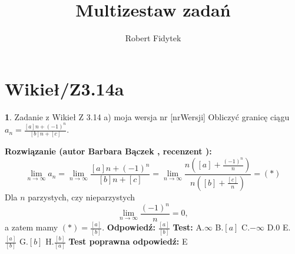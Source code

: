 \documentclass[12pt, a4paper]{article}
\title{Multizestaw zadań}
\author{Robert Fidytek}
\date{}
\theoremstyle{definition} %
\newtheorem{zad}{}
\newcommand{\kategoria}[1]{\section{#1}} %
\newcommand{\zadStart}[1]{\begin{zad}#1\newline} %
\newcommand{\zadStop}{\end{zad}}   %
\newcommand{\rozwStart}[2]{\noindent \textbf{Rozwiązanie (autor #1 , recenzent #2): }\newline} %
\newcommand{\rozwStop}{\newline}                                            %
\newcommand{\odpStart}{\noindent \textbf{Odpowiedź:}\newline}    %
\newcommand{\odpStop}{\newline}                                             %
\newcommand{\testStart}{\noindent \textbf{Test:}\newline} %
\newcommand{\testStop}{\newline} %
\newcommand{\kluczStart}{\noindent \textbf{Test poprawna odpowiedź:}\newline} %
\newcommand{\kluczStop}{\newline} %
\begin{document}
\maketitle


\kategoria{Wikieł/Z3.14a}
\zadStart{Zadanie z Wikieł Z 3.14 a) moja wersja nr [nrWersji]}
Obliczyć granicę ciągu $a_n= \frac{[a]n + {(-1)}^n}{[b]n+[c]}$.
\zadStop
\rozwStart{Barbara Bączek}{}
$$\lim_{n \rightarrow \infty} a_n= \lim_{n \rightarrow \infty} \frac{[a]n + {(-1)}^n}{[b]n+[c]}=  \lim_{n \rightarrow \infty} \frac{n([a] + \frac{{(-1)}^n}{n})}{n([b]+\frac{[c]}{n})} = (*)$$
Dla $n$ parzystych, czy nieparzystych $$ \lim_{n \rightarrow \infty} \frac{{(-1)}^n}{n} = 0, $$
a zatem mamy $(*)= \frac{[a]}{[b]}$. 
\rozwStop
\odpStart
$\frac{[a]}{[b]}$
\odpStop
\testStart
A.$\infty$
B.$[a]$
C.$-\infty$
D.$0$
E.$\frac{[a]}{[b]}$
G.$[b]$
H.$\frac{[b]}{[a]}$
\testStop
\kluczStart
E
\kluczStop
\end{document}
